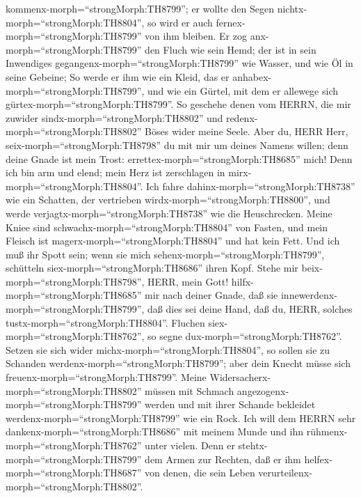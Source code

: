kommenx-morph=``strongMorph:TH8799''; er wollte den Segen
nichtx-morph=``strongMorph:TH8804'', so wird er auch
fernex-morph=``strongMorph:TH8799'' von ihm bleiben.  Er
zog anx-morph=``strongMorph:TH8799'' den Fluch wie sein Hemd; der ist in
sein Inwendiges gegangenx-morph=``strongMorph:TH8799'' wie Wasser, und
wie Öl in seine Gebeine;  So werde er ihm wie ein Kleid,
das er anhabex-morph=``strongMorph:TH8799'', und wie ein Gürtel, mit dem
er allewege sich gürtex-morph=``strongMorph:TH8799''.  So
geschehe denen vom HERRN, die mir zuwider
sindx-morph=``strongMorph:TH8802'' und
redenx-morph=``strongMorph:TH8802'' Böses wider meine Seele.
 Aber du, HERR Herr, seix-morph=``strongMorph:TH8798'' du
mit mir um deines Namens willen; denn deine Gnade ist mein Trost:
errettex-morph=``strongMorph:TH8685'' mich!  Denn ich bin
arm und elend; mein Herz ist zerschlagen in
mirx-morph=``strongMorph:TH8804''.  Ich fahre
dahinx-morph=``strongMorph:TH8738'' wie ein Schatten, der vertrieben
wirdx-morph=``strongMorph:TH8800'', und werde
verjagtx-morph=``strongMorph:TH8738'' wie die Heuschrecken.
 Meine Kniee sind schwachx-morph=``strongMorph:TH8804'' von
Fasten, und mein Fleisch ist magerx-morph=``strongMorph:TH8804'' und hat
kein Fett.  Und ich muß ihr Spott sein; wenn sie mich
sehenx-morph=``strongMorph:TH8799'', schütteln
siex-morph=``strongMorph:TH8686'' ihren Kopf.  Stehe mir
beix-morph=``strongMorph:TH8798'', HERR, mein Gott!
hilfx-morph=``strongMorph:TH8685'' mir nach deiner Gnade, 
daß sie innewerdenx-morph=``strongMorph:TH8799'', daß dies sei deine
Hand, daß du, HERR, solches tustx-morph=``strongMorph:TH8804''.
 Fluchen siex-morph=``strongMorph:TH8762'', so segne
dux-morph=``strongMorph:TH8762''. Setzen sie sich wider
michx-morph=``strongMorph:TH8804'', so sollen sie zu Schanden
werdenx-morph=``strongMorph:TH8799''; aber dein Knecht müsse sich
freuenx-morph=``strongMorph:TH8799''.  Meine
Widersacherx-morph=``strongMorph:TH8802'' müssen mit Schmach
angezogenx-morph=``strongMorph:TH8799'' werden und mit ihrer Schande
bekleidet werdenx-morph=``strongMorph:TH8799'' wie ein Rock.
 Ich will dem HERRN sehr
dankenx-morph=``strongMorph:TH8686'' mit meinem Munde und ihn
rühmenx-morph=``strongMorph:TH8762'' unter vielen.  Denn er
stehtx-morph=``strongMorph:TH8799'' dem Armen zur Rechten, daß er ihm
helfex-morph=``strongMorph:TH8687'' von denen, die sein Leben
verurteilenx-morph=``strongMorph:TH8802''.

